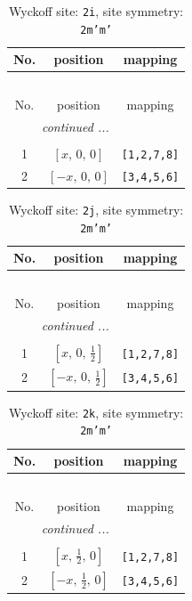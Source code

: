 \documentclass[fleqn,8pt]{jsarticle}
\begin{document}
\renewcommand{\arraystretch}{1.2}
\begin{longtable}{ccc}
\caption{Wyckoff site: {\tt 2i}, site symmetry: {\tt 2m'm'}}
 \\
 \hline \hline
No. & position & mapping \\ \hline \endfirsthead

\multicolumn{2}{l}{\tablename\ \thetable{}} \\
 \hline \hline
No. & position & mapping \\ \hline \endhead

 \hline \hline
\multicolumn{2}{r}{\footnotesize\it continued ...} \\ \endfoot

 \hline \hline
\multicolumn{2}{r}{} \\ \endlastfoot

1 & $\left[ x,\, 0,\, 0 \right]$ & {\tt [1,2,7,8]} \\ \hline
2 & $\left[ - x,\, 0,\, 0 \right]$ & {\tt [3,4,5,6]} \\
\end{longtable}
\renewcommand{\arraystretch}{1.2}
\begin{longtable}{ccc}
\caption{Wyckoff site: {\tt 2j}, site symmetry: {\tt 2m'm'}}
 \\
 \hline \hline
No. & position & mapping \\ \hline \endfirsthead

\multicolumn{2}{l}{\tablename\ \thetable{}} \\
 \hline \hline
No. & position & mapping \\ \hline \endhead

 \hline \hline
\multicolumn{2}{r}{\footnotesize\it continued ...} \\ \endfoot

 \hline \hline
\multicolumn{2}{r}{} \\ \endlastfoot

1 & $\left[ x,\, 0,\, \frac{1}{2} \right]$ & {\tt [1,2,7,8]} \\ \hline
2 & $\left[ - x,\, 0,\, \frac{1}{2} \right]$ & {\tt [3,4,5,6]} \\
\end{longtable}
\renewcommand{\arraystretch}{1.2}
\begin{longtable}{ccc}
\caption{Wyckoff site: {\tt 2k}, site symmetry: {\tt 2m'm'}}
 \\
 \hline \hline
No. & position & mapping \\ \hline \endfirsthead

\multicolumn{2}{l}{\tablename\ \thetable{}} \\
 \hline \hline
No. & position & mapping \\ \hline \endhead

 \hline \hline
\multicolumn{2}{r}{\footnotesize\it continued ...} \\ \endfoot

 \hline \hline
\multicolumn{2}{r}{} \\ \endlastfoot

1 & $\left[ x,\, \frac{1}{2},\, 0 \right]$ & {\tt [1,2,7,8]} \\ \hline
2 & $\left[ - x,\, \frac{1}{2},\, 0 \right]$ & {\tt [3,4,5,6]} \\
\end{longtable}
\end{document}

